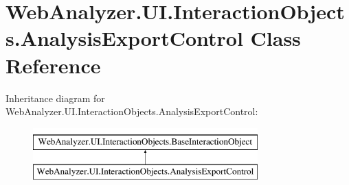 \hypertarget{class_web_analyzer_1_1_u_i_1_1_interaction_objects_1_1_analysis_export_control}{}\section{Web\+Analyzer.\+U\+I.\+Interaction\+Objects.\+Analysis\+Export\+Control Class Reference}
\label{class_web_analyzer_1_1_u_i_1_1_interaction_objects_1_1_analysis_export_control}
Inheritance diagram for Web\+Analyzer.\+U\+I.\+Interaction\+Objects.\+Analysis\+Export\+Control\+:\begin{figure}[H]
\begin{center}
\leavevmode
\includegraphics[height=2.000000cm]{class_web_analyzer_1_1_u_i_1_1_interaction_objects_1_1_analysis_export_control}
\end{center}
\end{figure}
